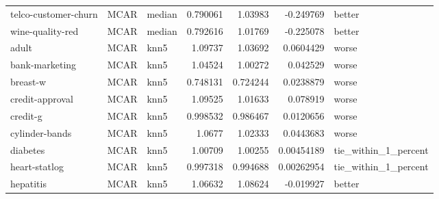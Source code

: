 \begin{table}[ht]
\begin{tabular}{lllrrrl}
 telco-customer-churn & MCAR        & median           &                                 0.790061 &                             1.03983  &                    -0.249769   & better               \\
 wine-quality-red     & MCAR        & median           &                                 0.792616 &                             1.01769  &                    -0.225078   & better               \\
 adult                & MCAR        & knn5             &                                 1.09737  &                             1.03692  &                     0.0604429  & worse                \\
 bank-marketing       & MCAR        & knn5             &                                 1.04524  &                             1.00272  &                     0.042529   & worse                \\
 breast-w             & MCAR        & knn5             &                                 0.748131 &                             0.724244 &                     0.0238879  & worse                \\
 credit-approval      & MCAR        & knn5             &                                 1.09525  &                             1.01633  &                     0.078919   & worse                \\
 credit-g             & MCAR        & knn5             &                                 0.998532 &                             0.986467 &                     0.0120656  & worse                \\
 cylinder-bands       & MCAR        & knn5             &                                 1.0677   &                             1.02333  &                     0.0443683  & worse                \\
 diabetes             & MCAR        & knn5             &                                 1.00709  &                             1.00255  &                     0.00454189 & tie\_within\_1\_percent \\
 heart-statlog        & MCAR        & knn5             &                                 0.997318 &                             0.994688 &                     0.00262954 & tie\_within\_1\_percent \\
 hepatitis            & MCAR        & knn5             &                                 1.06632  &                             1.08624  &                    -0.019927   & better               \\

\end{tabular}
\end{table}
